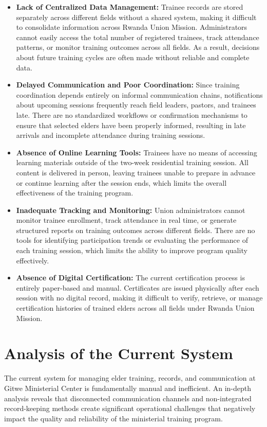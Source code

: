 \documentclass[12pt]{report}
\begin{document}
\begin{itemize}
    \item \textbf{Lack of Centralized Data Management:} Trainee records are stored separately across different fields without a shared system, making it difficult to consolidate information across Rwanda Union Mission. Administrators cannot easily access the total number of registered trainees, track attendance patterns, or monitor training outcomes across all fields. As a result, decisions about future training cycles are often made without reliable and complete data.
    \item \textbf{Delayed Communication and Poor Coordination:} Since training coordination depends entirely on informal communication chains, notifications about upcoming sessions frequently reach field leaders, pastors, and trainees late. There are no standardized workflows or confirmation mechanisms to ensure that selected elders have been properly informed, resulting in late arrivals and incomplete attendance during training sessions.
    \item \textbf{Absence of Online Learning Tools:} Trainees have no means of accessing learning materials outside of the two-week residential training session. All content is delivered in person, leaving trainees unable to prepare in advance or continue learning after the session ends, which limits the overall effectiveness of the training program.
    \item \textbf{Inadequate Tracking and Monitoring:} Union administrators cannot monitor trainee enrollment, track attendance in real time, or generate structured reports on training outcomes across different fields. There are no tools for identifying participation trends or evaluating the performance of each training session, which limits the ability to improve program quality effectively.
    \item \textbf{Absence of Digital Certification:} The current certification process is entirely paper-based and manual. Certificates are issued physically after each session with no digital record, making it difficult to verify, retrieve, or manage certification histories of trained elders across all fields under Rwanda Union Mission.
\end{itemize}

\section{Analysis of the Current System}
The current system for managing elder training, records, and communication at Gitwe Ministerial Center is fundamentally manual and inefficient. An in-depth analysis reveals that disconnected communication channels and non-integrated record-keeping methods create significant operational challenges that negatively impact the quality and reliability of the ministerial training program.
\end{document}
